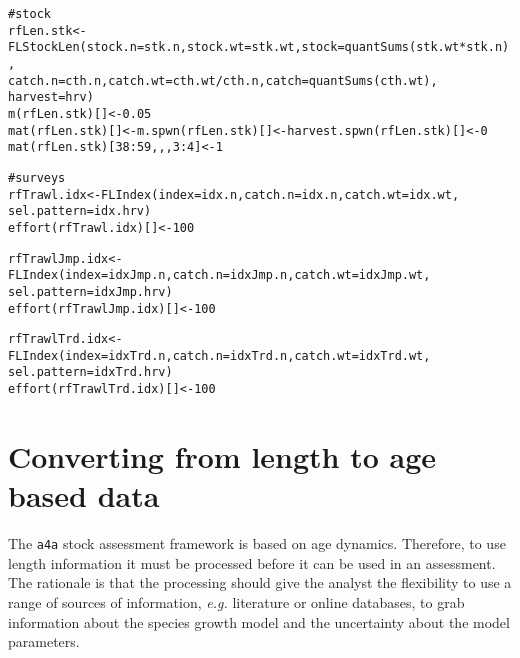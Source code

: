 \documentclass[a4paper,english,10pt]{article}\usepackage[]{graphicx}\usepackage[]{color}
\makeatletter
\newcommand{\hlnum}[1]{\textcolor[rgb]{0.2,0.2,0.2}{#1}}%
\newcommand{\hlcom}[1]{\textcolor[rgb]{0.2,0.267,0.4}{#1}}%
\newcommand{\hlopt}[1]{\textcolor[rgb]{0.2,0.2,0.2}{#1}}%
\newcommand{\hlstd}[1]{\textcolor[rgb]{0,0,0}{#1}}%
\newcommand{\hlkwb}[1]{\textcolor[rgb]{0.361,0.506,0.596}{#1}}%
\newcommand{\hlkwc}[1]{\textcolor[rgb]{0.361,0.506,0.596}{#1}}%
\newcommand{\hlkwd}[1]{\textcolor[rgb]{0.361,0.506,0.596}{#1}}%
\newenvironment{kframe}{%
 \def\at@end@of@kframe{}%
 \ifinner\ifhmode%
  \def\at@end@of@kframe{\end{minipage}}%
  \begin{minipage}{\columnwidth}%
 \fi\fi%
 \def\FrameCommand##1{\hskip\@totalleftmargin \hskip-\fboxsep
 \colorbox{shadecolor}{##1}\hskip-\fboxsep
     \hskip-\linewidth \hskip-\@totalleftmargin \hskip\columnwidth}%
 \MakeFramed {\advance\hsize-\width
   \@totalleftmargin\z@ \linewidth\hsize
   \@setminipage}}%
 {\par\unskip\endMakeFramed%
 \at@end@of@kframe}
\newenvironment{knitrout}{}{} %
\newcommand{\initiative}[1]{{\texttt{#1}}}
\makeatother
\begin{document}
\begin{knitrout}
\color{fgcolor}\begin{kframe}
\begin{alltt}
\hlcom{# stock}
\hlstd{rfLen.stk} \hlkwb{<-} \hlkwd{FLStockLen}\hlstd{(}\hlkwc{stock.n}\hlstd{=stk.n,} \hlkwc{stock.wt}\hlstd{=stk.wt,} \hlkwc{stock}\hlstd{=}\hlkwd{quantSums}\hlstd{(stk.wt}\hlopt{*}\hlstd{stk.n),}
                        \hlkwc{catch.n}\hlstd{=cth.n,} \hlkwc{catch.wt}\hlstd{=cth.wt}\hlopt{/}\hlstd{cth.n,} \hlkwc{catch}\hlstd{=}\hlkwd{quantSums}\hlstd{(cth.wt),}
                        \hlkwc{harvest}\hlstd{=hrv)}
\hlkwd{m}\hlstd{(rfLen.stk)[]} \hlkwb{<-} \hlnum{0.05}
\hlkwd{mat}\hlstd{(rfLen.stk)[]} \hlkwb{<-} \hlkwd{m.spwn}\hlstd{(rfLen.stk)[]} \hlkwb{<-} \hlkwd{harvest.spwn}\hlstd{(rfLen.stk)[]} \hlkwb{<-} \hlnum{0}
\hlkwd{mat}\hlstd{(rfLen.stk)[}\hlnum{38}\hlopt{:}\hlnum{59}\hlstd{,,,}\hlnum{3}\hlopt{:}\hlnum{4}\hlstd{]} \hlkwb{<-} \hlnum{1}

\hlcom{# surveys}
\hlstd{rfTrawl.idx} \hlkwb{<-} \hlkwd{FLIndex}\hlstd{(}\hlkwc{index}\hlstd{=idx.n,} \hlkwc{catch.n}\hlstd{=idx.n,} \hlkwc{catch.wt}\hlstd{=idx.wt,}
                       \hlkwc{sel.pattern}\hlstd{=idx.hrv)}
\hlkwd{effort}\hlstd{(rfTrawl.idx)[]} \hlkwb{<-} \hlnum{100}

\hlstd{rfTrawlJmp.idx} \hlkwb{<-} \hlkwd{FLIndex}\hlstd{(}\hlkwc{index}\hlstd{=idxJmp.n,} \hlkwc{catch.n}\hlstd{=idxJmp.n,} \hlkwc{catch.wt}\hlstd{=idxJmp.wt,}
                          \hlkwc{sel.pattern}\hlstd{=idxJmp.hrv)}
\hlkwd{effort}\hlstd{(rfTrawlJmp.idx)[]} \hlkwb{<-} \hlnum{100}

\hlstd{rfTrawlTrd.idx} \hlkwb{<-} \hlkwd{FLIndex}\hlstd{(}\hlkwc{index}\hlstd{=idxTrd.n,} \hlkwc{catch.n}\hlstd{=idxTrd.n,} \hlkwc{catch.wt}\hlstd{=idxTrd.wt,}
                          \hlkwc{sel.pattern}\hlstd{=idxTrd.hrv)}
\hlkwd{effort}\hlstd{(rfTrawlTrd.idx)[]} \hlkwb{<-} \hlnum{100}
\end{alltt}
\end{kframe}
\end{knitrout}

\pagebreak
\section{Converting from length to age based data}\label{sec:l2a}

The \initiative{a4a} stock assessment framework is based on age dynamics. Therefore, to use length information it must be processed before it can be used in an assessment. The rationale is that the processing should give the analyst the flexibility to use a range of sources of information, \emph{e.g.} literature or online databases, to grab information about the species growth model and the uncertainty about the model parameters.
\end{document}
